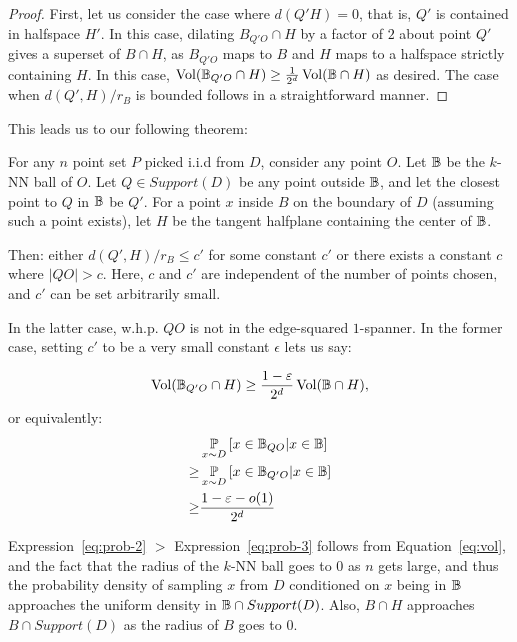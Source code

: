 \begin{proof} First, let us consider the case where $d(Q' H) =
0$, that is, $Q'$ is contained in halfspace $H'$.  In this case,
  dilating $B_{Q'O} \cap H$ by a factor of $2$ about point $Q'$
  gives a superset of $B\cap H$, as $B_{Q'O}$ maps to $B$ and $H$
  maps to a halfspace strictly containing $H$. In this case,
  $\operatorname{Vol}(\mathbb{B}_{Q'O} \cap H) \geq \frac{1}{2^d} \operatorname{Vol}(\mathbb{B} \cap H)$ as
  desired.
  The case when
  $d(Q', H)/r_B$ is bounded follows in a straightforward manner.
  \end{proof}


This leads us to our following theorem:
\begin{theorem} For any $n$ point set $P$ picked i.i.d from $D$, consider any
  point $O$. Let $\mathbb{B}$ be the $k$-NN ball of $O$.
  Let $Q \in Support(D)$ be any point outside
  $\mathbb{B}$, and let the closest point to $Q$ in $\mathbb{B}$ be $Q'$. For a
  point $x$ inside $B$ on the boundary of $D$ (assuming such a
  point exists), let $H$ be the tangent halfplane containing the
  center of $\mathbb{B}$.

  Then: either $d(Q', H) /
  r_B \leq c'$ for some constant $c'$ or there exists a constant
  $c$ where $|QO| > c$. Here, $c$ and $c'$ are
  independent of the number of points chosen, and $c'$ can be set
  arbitrarily small.

  In the latter case, w.h.p. $QO$ is not in the edge-squared
  $1$-spanner. In the former case, setting $c'$ to be a very
  small constant $\epsilon$ lets us say:

  \begin{align} \label{eq:vol}
    \operatorname{Vol}(\mathbb{B}_{Q'O} \cap H) \geq \frac{1-\varepsilon}{2^d} \operatorname{Vol}(\mathbb{B}
    \cap H),
  \end{align}
  or equivalently:
  \begin{align} \label{eq:prob}
    & \operatorname*{\mathbb{P}}_{x\sim D}\left[ x \in \mathbb{B}_{QO} | x \in \mathbb{B} \right]
  \\
    \label{eq:prob-2}
    \geq & \operatorname*{\mathbb{P}}_{x\sim D}\left[ x \in \mathbb{B}_{Q'O} | x \in \mathbb{B} \right]
  \\ \label{eq:prob-3}
    \geq & \frac{1-\varepsilon-o(1)}{2^d}
  \end{align}
\end{theorem}
Expression~\ref{eq:prob-2} $>$ Expression~\ref{eq:prob-3} follows from Equation~\ref{eq:vol}, and
the fact that the radius of the $k$-NN ball goes to $0$ as $n$
gets large, and thus the probability density of sampling $x$ from
$D$ conditioned on $x$ being in $\mathbb{B}$ approaches the uniform
density in $\mathbb{B} \cap Support(D)$. Also, $B \cap H$ approaches $B \cap Support(D)$ as the
radius of $B$ goes to $0$.

